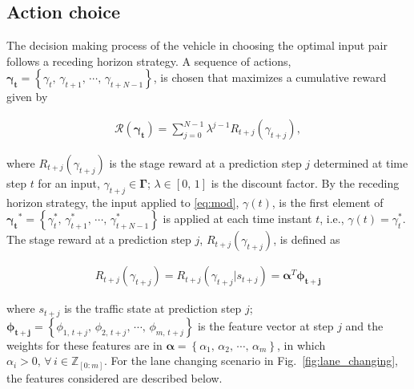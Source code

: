 \documentclass[10pt,journal]{IEEEtran}
\begin{document}
	\subsection{Action choice}
	\label{sec:action_choice}
	
	The decision making process of the vehicle in choosing the optimal input pair follows a receding horizon strategy. A sequence of actions, $\boldsymbol{\gamma_{t}} = \left\{\gamma_{t},\,\gamma_{t+1},\,\cdots,\,\gamma_{t+N-1}\right\}$, is chosen that maximizes a cumulative reward given by
	
	\begin{align}
	\mathcal{R}\left(\boldsymbol{\gamma_{t}}\right) = \sum_{j=0}^{N-1} \lambda^{j-1} R_{t+j}\left(\gamma_{t+j}\right),
	\label{eq:cum_reward}
	\end{align}
	
	\noindent where $R_{t+j}\left(\gamma_{t+j}\right)$ is the stage reward at a prediction step $j$ determined at time step $t$ for an input, $\gamma_{t+j} \in  \boldsymbol{\Gamma}$; $\lambda \in \left[0,\,1\right]$ is the discount factor. By the receding horizon strategy, the input applied to \eqref{eq:mod}, $\gamma\left(t\right)$, is the first element of $\boldsymbol{\gamma_{t}}^* = \left\{\gamma_{t}^*,\,\gamma_{t+1}^*,\,\cdots,\,\gamma_{t+N-1}^*\right\}$ is applied at each time instant $t$, i.e.,  $\gamma\left(t\right) = \gamma_{t}^*$. The stage reward at a prediction step $j$, $R_{t+j}\left(\gamma_{t+j}\right)$, is defined as
	 
	 \begin{align}
	 R_{t+j}\left(\gamma_{t+j}\right) = R_{t+j}\left(\gamma_{t+j}| s_{t+j}\right) = \boldsymbol{{\alpha}}^T \boldsymbol{\phi_{t+j}}
	 \end{align}
	
	\noindent where $s_{t+j}$ is the traffic state  at prediction step $j$;  $\boldsymbol{{\phi}_{t+j}} = \left\{\phi_{1,\,{t+j}},\,\phi_{2,\,{t+j}},\,\cdots,\,\phi_{m,\,{t+j}}\right\}$ is the feature vector at step $j$ and the weights for these features are in  $\boldsymbol{{\alpha}} = \left\{\alpha_{1},\,\alpha_{2},\,\cdots,\,\alpha_{m}\right\}$, in which $\alpha_{i}>0,\,\forall \, i\in \mathbb{Z}_{\left[0:m\right]}$. For the lane changing scenario in  Fig.~\ref{fig:lane_changing}, the  features considered are described below. 
	
\end{document}
